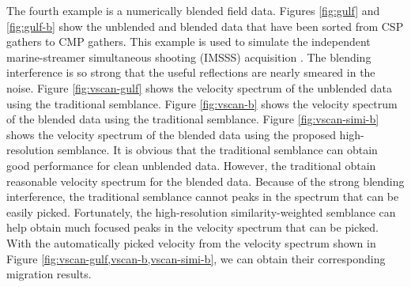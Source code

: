 The fourth example is a numerically blended  field data. Figures \ref{fig:gulf} and \ref{fig:gulf-b} show the unblended and blended data that have been sorted from CSP gathers to CMP gathers. This example is used to simulate the independent marine-streamer simultaneous shooting (IMSSS) acquisition \cite[]{yangkang2014nmo}.
The blending interference is so strong that the useful reflections are nearly smeared in the noise. Figure \ref{fig:vscan-gulf} shows the velocity spectrum of the unblended data using the traditional semblance. Figure \ref{fig:vscan-b} shows the velocity spectrum of the blended data using the traditional semblance. Figure \ref{fig:vscan-simi-b} shows the velocity spectrum of the blended data using the proposed high-resolution semblance. 
It is obvious that the traditional semblance can obtain good performance for clean unblended data. However, the traditional   obtain  reasonable velocity spectrum for the blended data. Because of the strong blending interference, the traditional semblance cannot   peaks in the spectrum that can be easily picked. Fortunately, the high-resolution similarity-weighted semblance can help obtain much focused peaks in the velocity spectrum that can be picked. With the automatically picked velocity \cite[]{fomel20091} from the velocity spectrum shown in Figure \ref{fig:vscan-gulf,vscan-b,vscan-simi-b}, we can obtain their corresponding migration results. 

